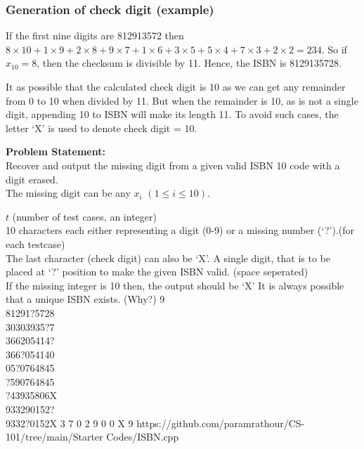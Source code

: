 \subsubsection{Generation of check digit (example)}
If the first nine digits are 812913572 then $8\times10 + 1\times9 + 2\times8 + 9\times7 + 1\times6 + 3\times5 + 5\times4 + 7\times3 + 2\times2 = 234$. So if $x_{10} = 8$, then the checksum is divisible by 11. Hence, the ISBN is 8129135728.
\begin{note}
It as possible that the calculated check digit is 10 as we can get any remainder from 0 to 10 when divided by 11. But when the remainder is 10, as is not a single digit, appending 10 to ISBN will make its length 11. To avoid such cases, the letter `X' is used to denote check digit = 10.
\end{note}
\textbf{Problem Statement:}\\
Recover and output the missing digit from a given valid ISBN 10 code with a digit erased.\\
The missing digit can be any $x_i$ $(1\leq i\leq 10)$.
\begin{testcases}
	{$t$ \hfill(number of test cases, an integer)\\
	10 characters each either representing a digit (0-9) or a missing number (‘?’).\hfill(for each testcase)\\
	The last character (check digit) can also be `X'.}
	{A single digit, that is to be placed at `?' position to make the given ISBN valid.
 \hfill{(space seperated)}\\
	If the missing integer is 10 then, the output should be `X'}
	{It is always possible that a unique ISBN exists. (Why?)}
	{9\\81291?5728\\30303935?7\\366205414?\\366?054140\\05?0764845\\?590764845\\?43935806X\\933290152?\\9332?0152X}
	{3 7 0 2 9 0 0 X 9}
	{https://github.com/paramrathour/CS-101/tree/main/Starter Codes/ISBN.cpp}
\end{testcases}
